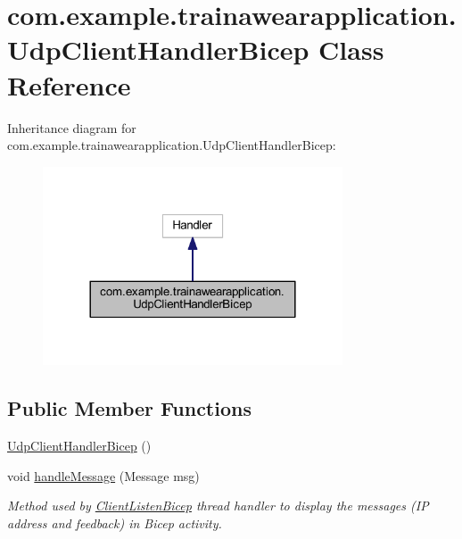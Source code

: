 \hypertarget{classcom_1_1example_1_1trainawearapplication_1_1_udp_client_handler_bicep}{}\section{com.\+example.\+trainawearapplication.\+Udp\+Client\+Handler\+Bicep Class Reference}
\label{classcom_1_1example_1_1trainawearapplication_1_1_udp_client_handler_bicep}


Inheritance diagram for com.\+example.\+trainawearapplication.\+Udp\+Client\+Handler\+Bicep\+:
\nopagebreak
\begin{figure}[H]
\begin{center}
\leavevmode
\includegraphics[width=252pt]{classcom_1_1example_1_1trainawearapplication_1_1_udp_client_handler_bicep__inherit__graph}
\end{center}
\end{figure}
\subsection*{Public Member Functions}
\begin{DoxyCompactItemize}
\item 
\mbox{\hyperlink{classcom_1_1example_1_1trainawearapplication_1_1_udp_client_handler_bicep_afa5c7cacbf23c1527423e8bf7c22abe1}{Udp\+Client\+Handler\+Bicep}} ()
\item 
void \mbox{\hyperlink{classcom_1_1example_1_1trainawearapplication_1_1_udp_client_handler_bicep_a083761d7050084ba7f64723dc178487a}{handle\+Message}} (Message msg)
\begin{DoxyCompactList}\small\item\em Method used by \mbox{\hyperlink{classcom_1_1example_1_1trainawearapplication_1_1_client_listen_bicep}{Client\+Listen\+Bicep}} thread handler to display the messages (IP address and feedback) in Bicep activity. \end{DoxyCompactList}\end{DoxyCompactItemize}
